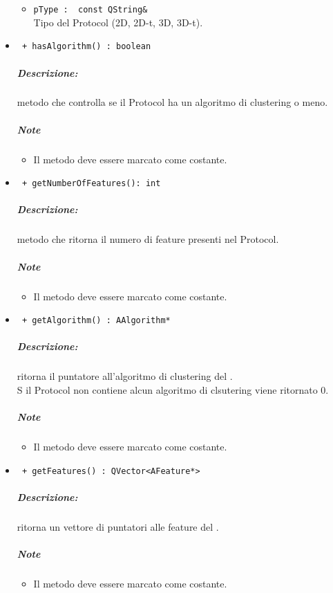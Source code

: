 \begin{itemize}
\begin{itemize}
					\item \color{RoyalPurple}\verb!pType :  const QString&!\\
					\color{black}Tipo del Protocol\g{} (2D, 2D-t, 3D, 3D-t).
				\end{itemize}
		
		\item \color{blue}\verb! + hasAlgorithm() : boolean!\\
		\color{black}
		\subparagraph{Descrizione:} metodo che controlla se il Protocol\g{} ha un algoritmo di clustering\g{} o meno.
		\subparagraph{Note}
			\begin{itemize}
				\item Il metodo deve essere marcato come costante.
			\end{itemize}		
		
		\item \color{blue}\verb! + getNumberOfFeatures(): int!\\
		\color{black}
		\subparagraph{Descrizione:} metodo che ritorna il numero di feature\g{} presenti nel Protocol\g{}.
		\subparagraph{Note}
			\begin{itemize}
				\item Il metodo deve essere marcato come costante.
			\end{itemize}
		
		\item \color{blue}\verb! + getAlgorithm() : AAlgorithm* !\\
		\color{black}
		\subparagraph{Descrizione:} ritorna il puntatore all'algoritmo di clustering\g{} del \protocol{}.
		\\S il Protocol\g{} non contiene alcun algoritmo di clsutering\g{} viene ritornato 0.
		\subparagraph{Note}
		\begin{itemize}
			\item Il metodo deve essere marcato come costante.
		\end{itemize}
		
		\item \color{blue}\verb! + getFeatures() : QVector<AFeature*> !\\
		\color{black} 
		\subparagraph{Descrizione:} ritorna un vettore di puntatori alle feature\g{} del \protocol{}.
		\subparagraph{Note}	
		\begin{itemize}
			\item Il metodo deve essere marcato come costante.
		\end{itemize}
		

\end{itemize}
